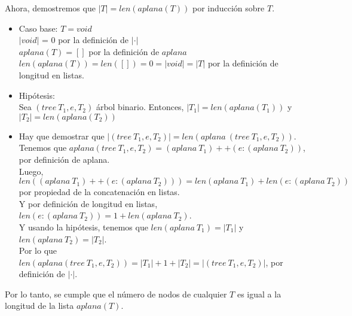 \documentclass{article}
\begin{document}
\begin{enumerate}
{\begin{enumerate}
{                    
                    Ahora, demostremos que $|T| = len(aplana(T))$ por inducción 
                    sobre $T$.
                    \begin{itemize}                    
                    \item {
                        Caso base: $T = void$\\
                        $|void|$ = 0 por la definición de $|\cdot|$\\
                        $aplana(T) = []$ por la definición de $aplana$ \\
                        $len(aplana(T)) = len([]) = 0 = |void| = |T|$ por la 
                        definición de longitud en listas.
                    }
					\item {
                        Hipótesis: \\
                        Sea $(tree \ T_1, e, T_2)$ árbol binario. Entonces, 
                        $|T_1| = len(aplana(T_1))$ y $|T_2| = len(aplana(T_2))$ 
                    }
                    \item {
                        Hay que demostrar que 
                        $|(tree \ T_1, e, T_2)| = len(aplana \ (tree \ T_1, e, T_2))$.\\
                        Tenemos que $aplana(tree \ T_1, e, T_2) = 
                        (aplana \ T_1) ++ (e:(aplana \ T_2))$, por definición de 
                        aplana.\\
                        Luego, $len((aplana \ T_1) ++ (e:(aplana \ T_2))) 
                        = len(aplana \ T_1) + len(e:(aplana \ T_2))$ por 
                        propiedad de la concatenación en listas.\\
                        Y por definición de longitud en listas, 
                        $len(e:(aplana \ T_2)) = 1 + len(aplana \ T_2)$.\\
                        Y usando la hipótesis, tenemos que 
                        $len(aplana \ T_1) = |T_1|$ y $len(aplana \ T_2) = |T_2|$.\\
                        Por lo que $len(aplana (tree \ T_1, e, T_2)) 
                        = |T_1| + 1 + |T_2| = |(tree \ T_1, e, T_2)|$,
                        por definición de $|\cdot|$.
                    }
                \end{itemize}
                Por lo tanto, se cumple  que el número de nodos de cualquier $T$ es 
                igual a la longitud de la lista $aplana(T)$.
            }
                

\end{enumerate}}
\end{enumerate}
\end{document}
